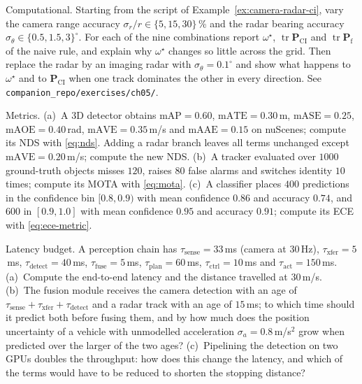 \documentclass[graybox,envcountchap]{style/SNmono}
\DeclareMathOperator{\tr}{tr}
\newcommand{\repopath}[1]{\texttt{#1}}
\begin{document}
\begin{prob}\label{prob:ch05:6}
Computational. Starting from the script of Example~\ref{ex:camera-radar-ci}, vary the camera range accuracy $\sigma_{r}/r\in\{5,15,30\}$\,\% and the radar bearing accuracy $\sigma_{\theta}\in\{0.5,1.5,3\}^{\circ}$. For each of the nine combinations report $\omega^{\star}$, $\tr\mathbf{P}_{\mathrm{CI}}$ and $\tr\mathbf{P}_{\mathrm{f}}$ of the naive rule, and explain why $\omega^{\star}$ changes so little across the grid. Then replace the radar by an imaging radar with $\sigma_{\theta}=0.1^{\circ}$ and show what happens to $\omega^{\star}$ and to $\mathbf{P}_{\mathrm{CI}}$ when one track dominates the other in every direction. See \repopath{companion\_\allowbreak repo/\allowbreak exercises/\allowbreak ch05/\allowbreak }.
\end{prob}

\begin{prob}\label{prob:ch05:7}
Metrics. (a)~A 3D detector obtains $\mathrm{mAP}=0.60$, $\mathrm{mATE}=0.30$\,m, $\mathrm{mASE}=0.25$, $\mathrm{mAOE}=0.40$\,rad, $\mathrm{mAVE}=0.35$\,m/s and $\mathrm{mAAE}=0.15$ on nuScenes; compute its NDS with \eqref{eq:nds}. Adding a radar branch leaves all terms unchanged except $\mathrm{mAVE}=0.20$\,m/s; compute the new NDS. (b)~A tracker evaluated over $1000$ ground-truth objects misses $120$, raises $80$ false alarms and switches identity $10$ times; compute its MOTA with \eqref{eq:mota}. (c)~A classifier places $400$ predictions in the confidence bin $[0.8,0.9)$ with mean confidence $0.86$ and accuracy $0.74$, and $600$ in $[0.9,1.0]$ with mean confidence $0.95$ and accuracy $0.91$; compute its ECE with \eqref{eq:ece-metric}.
\end{prob}

\begin{prob}\label{prob:ch05:8}
Latency budget. A perception chain has $\tau_{\mathrm{sense}}=33$\,ms (camera at $30$\,Hz), $\tau_{\mathrm{xfer}}=5$\,ms, $\tau_{\mathrm{detect}}=40$\,ms, $\tau_{\mathrm{fuse}}=5$\,ms, $\tau_{\mathrm{plan}}=60$\,ms, $\tau_{\mathrm{ctrl}}=10$\,ms and $\tau_{\mathrm{act}}=150$\,ms. (a)~Compute the end-to-end latency and the distance travelled at $30$\,m/s. (b)~The fusion module receives the camera detection with an age of $\tau_{\mathrm{sense}}+\tau_{\mathrm{xfer}}+\tau_{\mathrm{detect}}$ and a radar track with an age of $15$\,ms; to which time should it predict both before fusing them, and by how much does the position uncertainty of a vehicle with unmodelled acceleration $\sigma_{a}=0.8$\,m/s$^{2}$ grow when predicted over the larger of the two ages? (c)~Pipelining the detection on two GPUs doubles the throughput: how does this change the latency, and which of the terms would have to be reduced to shorten the stopping distance?
\end{prob}
\end{document}
